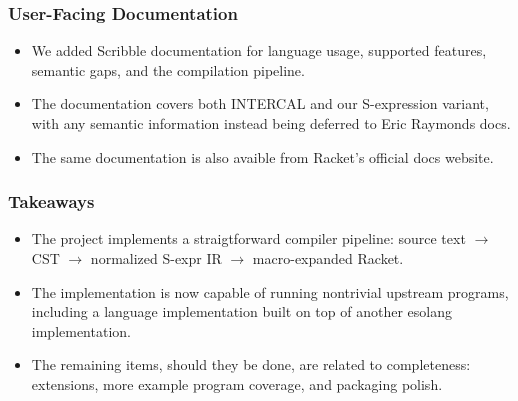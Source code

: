 \documentclass{beamer}
\begin{document}
\begin{frame}
  \frametitle{User-Facing Documentation}

  \begin{itemize}
    \item We added Scribble documentation for language usage, supported features, semantic gaps, and the compilation pipeline.
    \item The documentation covers both INTERCAL and our S-expression variant, with any semantic information instead being deferred to Eric Raymonds docs.
    \item The same documentation is also avaible from Racket's official docs website.
  \end{itemize}
\end{frame}

\begin{frame}
  \frametitle{Takeaways}

  \begin{itemize}
    \item The project implements a straigtforward compiler pipeline: source text $\rightarrow$ CST $\rightarrow$ normalized S-expr IR $\rightarrow$ macro-expanded Racket.
    \item The implementation is now capable of running nontrivial upstream programs, including a language implementation built on top of another esolang implementation.
    \item The remaining items, should they be done, are related to completeness: extensions, more example program coverage, and packaging polish.
  \end{itemize}
\end{frame}
\end{document}
